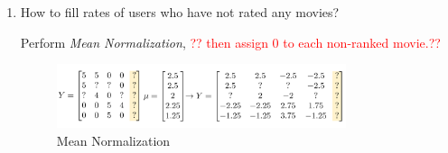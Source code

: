 \documentclass[12pt]{article}
\newenvironment{QandA}{\begin{enumerate}[label=\bfseries\arabic*.]\bfseries}
{\end{enumerate}}
\newenvironment{answered}{\par\normalfont\color{Sepia}}{}
\begin{document}
\begin{QandA}
\begin{answered}
\begin{itemize}
            \item \textbf{Content-based recommenders}

            \textbf{Advantages}
                \begin{itemize}
                    \item Works even when a product has no user reviews
                \end{itemize}

            \textbf{Disadvantages}
                \begin{itemize}
                    \item Needs descriptive data for every product that you want to recommend
                    \item Difficult to implement for many kinds of large product databases
                \end{itemize}
        \end{itemize}
    \end{answered}

    \item How to fill rates of users who have not rated any movies?
    \begin{answered}
        Perform \textit{Mean Normalization}, \textcolor{red}{?? then assign 0 to each non-ranked movie.??}
        \begin{figure}[H]
            \centering
            \includegraphics[width=0.8\textwidth]{mean_normalization.png}
            \caption{Mean Normalization}
            \label{fig:normalization}
        \end{figure}

    \end{answered}

\end{QandA}
\end{document}
